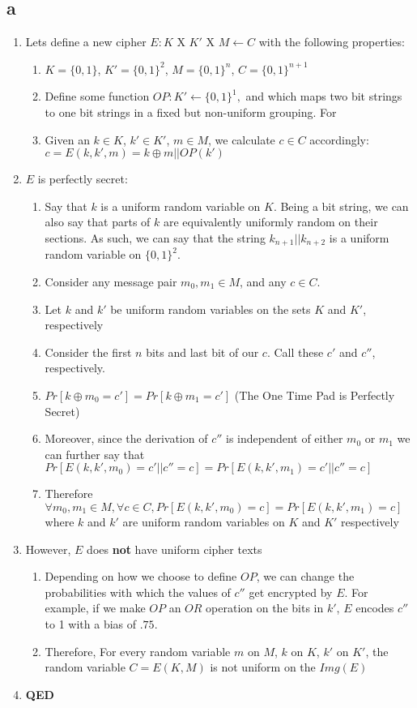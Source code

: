 \documentclass[]{article}
\begin{document}
\subsection{a}
\begin{enumerate}
	\item Lets define a new cipher $E: K$ X $K'$ X $M \leftarrow C$ with the following properties:
	\begin{enumerate}
		\item $K = \{0, 1\}$, $K' = \{0, 1\}^2$, $M = \{0, 1\} ^ n$, $C = \{0, 1\} ^ {n + 1}$
		\item Define some function $OP:K' \leftarrow \{0, 1\}^1,$ and which maps two bit strings to one bit strings in a fixed but non-uniform grouping. For                                                              
		\item Given an $k \in K$, $k' \in K'$, $m \in M$, we calculate $c \in C$ accordingly:
		\\
		$c = E(k,k',m) = k \oplus m ||  OP(k')$
	\end{enumerate}
	\item $E$ is perfectly secret:
	\begin{enumerate}
		\item Say that $k$ is a uniform random variable on $K$. Being a bit string, we can also say that parts of $k$ are equivalently uniformly random on their sections. As such, we can say that the string $k_{n+1}||k_{n+2}$ is a uniform random variable on $\{0, 1\}^2$.
		\item Consider any message pair $m_0, m_1 \in M$, and any $c \in C$.
		\item Let $k$ and $k'$ be uniform random variables on the sets $K$ and $K'$, respectively
		\item Consider the first $n$ bits and last bit of our $c$. Call these $c'$ and $c''$, respectively.
		\item $Pr[k \oplus m_0 = c'] = Pr[k \oplus m_1 = c']$ (The One Time Pad is Perfectly Secret)
		\item Moreover, since the derivation of $c''$ is independent of either $m_0$ or $m_1$ we can further say that $Pr[E(k,k',m_0) = c' || c '' = c] = Pr[E(k,k',m_1) = c' || c '' = c]$
		\item Therefore $\forall m_0, m_1 \in M, \forall c \in C, Pr[E(k,k',m_0) = c] = Pr[E(k,k',m_1) = c]$ where $k$ and $k'$ are uniform random variables on $K$ and $K'$ respectively
	\end{enumerate}
	\item However, $E$ does  \textbf{not} have uniform cipher texts
	\begin{enumerate}
		\item Depending on how we choose to define $OP$, we can change the probabilities with which the values of $c''$ get encrypted by $E$. For example, if we make $OP$ an $OR$ operation on the bits in $k'$, $E$ encodes $c''$ to 1 with a bias of $.75$.
		\item Therefore, For every random variable $m$ on $M$, $k$ on $K$, $k'$ on $K'$, the random variable $C=E(K,M)$ is not uniform on the $Img(E)$  
	\end{enumerate}
	\item \textbf{QED}
\end{enumerate}
\end{document}
